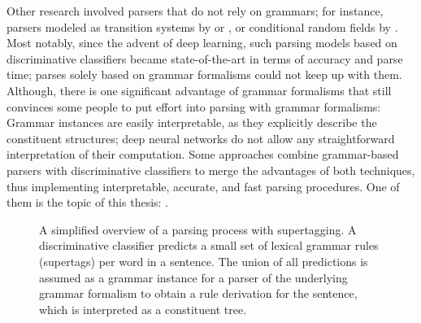 \documentclass[../document.tex]{subfiles}
\begin{document}
    Other research involved parsers that do not rely on grammars; for instance, parsers modeled as transition systems by \citet{Verseley14} or \citet{CoaCoh19}, or conditional random fields by \citet{Petrov08}.
    Most notably, since the advent of deep learning, such parsing models based on discriminative classifiers became state-of-the-art in terms of accuracy and parse time; parses solely based on grammar formalisms could not keep up with them.
    Although, there is one significant advantage of grammar formalisms that still convinces some people to put effort into parsing with grammar formalisms:
        Grammar instances are easily interpretable, as they explicitly describe the constituent structures; deep neural networks do not allow any straightforward interpretation of their computation.
    Some approaches combine grammar-based parsers with discriminative classifiers to merge the advantages of both techniques, thus implementing interpretable, accurate, and fast parsing procedures.
    One of them is the topic of this thesis: .

    \begin{figure}
        \resizebox{\linewidth}{!}{}
        \caption{\label{fig:supertagging}
            A simplified overview of a parsing process with supertagging.
            A discriminative classifier predicts a small set of lexical grammar rules (supertags) per word in a sentence.
            The union of all predictions is assumed as a grammar instance for a parser of the underlying grammar formalism to obtain a rule derivation for the sentence, which is interpreted as a constituent tree.
        }
    \end{figure}
\end{document}
